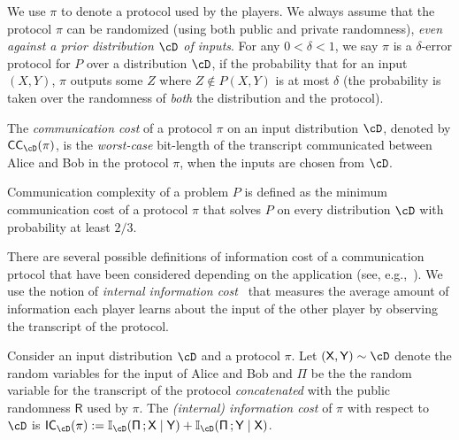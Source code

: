 \documentclass[11pt,letterpaper]{article}
\renewcommand{\paragraph}[1]{\medskip\noindent{\bf #1}\xspace}
\theoremstyle{definition}
\newcommand{\Prot}{\ensuremath{\Pi}}
\newcommand{\prot}{\ensuremath{\pi}}
\newcommand{\rX}{\rv{X}}
\newcommand{\rY}{\rv{Y}}
\newcommand{\rv}[1]{\ensuremath{\mathsf{#1}}}
\newcommand{\II}{\ensuremath{\mathbb{I}}}
\newcommand{\rProt}{\rv{\Prot}}
\newcommand{\rR}{\rv{R}}
\newcommand{\mii}[3]{\ensuremath{\II_{#3}(#1 \,; #2)}}
\newcommand{\CC}[2]{\ensuremath{\textnormal{\textsf{CC}}_{#2}(#1)}\xspace}
\newcommand{\ICost}[2]{\ensuremath{\textnormal{\textsf{IC}}_{#2}(#1)}\xspace}
\begin{document}
We use $\prot$ to denote a protocol used by the players. We always assume that the protocol $\prot$ can be randomized (using both public and
private randomness), \emph{even against a prior distribution $\cD$ of inputs}. For any
$0 < \delta < 1$, we say $\prot$ is a $\delta$-error protocol for $P$ over a distribution
$\cD$, if the probability that for an input $(X,Y)$, $\prot$ outputs some $Z$ where $Z \notin P(X,Y)$ is at most
$\delta$ (the probability is taken over the randomness of \emph{both} the distribution and the protocol).

\begin{definition}
  The \emph{communication cost} of a protocol $\prot$ on an input
  distribution $\cD$, denoted by $\CC{\prot}{\cD}$, is the \emph{worst-case} bit-length of the transcript
  communicated between Alice and Bob in the protocol $\prot$, when the inputs are chosen from $\cD$.

\end{definition}

Communication complexity of a problem $P$ is defined as the minimum communication cost of a protocol $\prot$ that solves $P$ on every distribution $\cD$ with probability at least $2/3$. 



\paragraph{Information complexity.} There are several possible definitions of information
cost of a communication prtocol that have been considered depending on the application (see, e.g.,~\cite{ChakrabartiSWY01,Bar-YossefJKS02,BarakBCR10,BravermanR11,BravermanEOPV13}).  
We use the notion of \emph{internal information cost}~\cite{BarakBCR10} that measures the average amount of information each player learns about the input of the other player
by observing the transcript of the protocol. %
\begin{definition}
  Consider an input distribution $\cD$ and a protocol $\prot$. Let $(\rX,\rY) \sim \cD$ denote the random variables for the input of Alice and Bob and $\rProt$ be the 
  the random variable for the transcript of the protocol \emph{concatenated} with the public randomness $\rR$ used by $\prot$. 
  The \emph{(internal) information cost} of $\prot$ with respect to
  $\cD$ is $\ICost{\prot}{\cD}:=\mii{\rProt}{\rX \mid \rY}{\cD} + \mii{\rProt}{\rY \mid \rX}{\cD}$. 

\end{definition}
\end{document}
